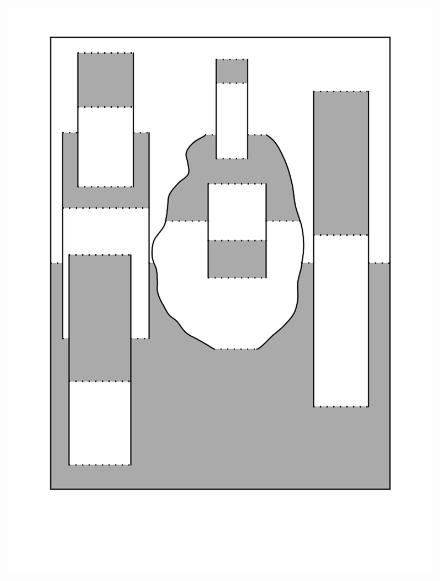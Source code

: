 \begin{figure}[htbp]
\centering
\includegraphics{figures/92_Appendix_Visual_Aids_Materials/shaded_card3.png}
\caption{}
\end{figure}

